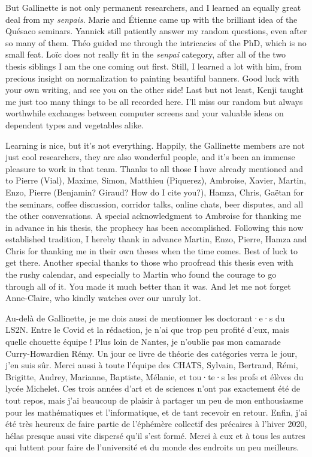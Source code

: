 But Gallinette is not only permanent researchers, and I learned an equally great deal from
my \textit{senpais}. Marie and Étienne came up with the brilliant idea of the Quésaco seminars.
Yannick still patiently answer my random questions, even after so many of them.
Théo guided me through the intricacies of the PhD, which is no small feat.
Loïc does not really fit in the \textit{senpai} category,
after all of the two thesis siblings I am
the one coming out first. Still, I learned a lot with him, from precious insight on
normalization to painting beautiful banners.
Good luck with your own writing, and see you on the other side!
Last but not least, Kenji taught me just too many things to be all recorded here.
I’ll miss our random but always worthwhile exchanges between computer screens and your
valuable ideas on dependent types and vegetables alike.

Learning is nice, but it’s not everything. Happily, the Gallinette members are not just
cool researchers, they are also wonderful people, and it’s been an immense pleasure to work
in that team. Thanks to all those I have already mentioned and to
Pierre (Vial), Maxime, Simon, Matthieu (Piquerez), Ambroise, Xavier, Martin, Enzo,
Pierre (Benjamin? Giraud? How do I cite you?), Hamza, Chris, Gaëtan
for the seminars, coffee discussion, corridor talks, online chats, beer disputes,
and all the other conversations. A special acknowledgment to Ambroise for thanking me in
advance in his thesis, the prophecy has been accomplished.
Following this now established tradition, I hereby thank in advance
Martin, Enzo, Pierre, Hamza and Chris for thanking me in their own theses when the time comes.
Best of luck to get there.
Another special thanks to those who proofread this thesis even with the rushy calendar,
and especially to Martin who found the courage to go through all of it. You made it much
better than it was.
And let me not forget Anne-Claire, who kindly watches over our unruly lot.


Au-delà de Gallinette, je me dois aussi de mentionner les doctorant·e·s du LS2N.
Entre le Covid et la rédaction, je n’ai que trop peu profité d’eux, mais quelle
chouette équipe !
Plus loin de Nantes, je n’oublie pas mon camarade Curry-Howardien Rémy.
Un jour ce livre de théorie des catégories verra le jour, j’en suis sûr.
Merci aussi à toute l’équipe des CHATS, Sylvain, Bertrand, Rémi,
Brigitte, Audrey, Marianne, Baptiste, Mélanie, et tou·te·s les profs et élèves du lycée
Michelet. Ces trois années d’art et de sciences n’ont pas exactement été de tout repos,
mais j’ai beaucoup de plaisir à partager un peu de mon enthousiasme pour
les mathématiques et l’informatique, et de tant recevoir en retour.
Enfin, j’ai été très heureux de faire partie de l’éphémère collectif des précaires à l’hiver
2020, hélas presque aussi vite dispersé qu’il s’est formé.
Merci à eux et à tous les autres qui luttent pour faire de l’université et
du monde des endroits un peu meilleurs.

